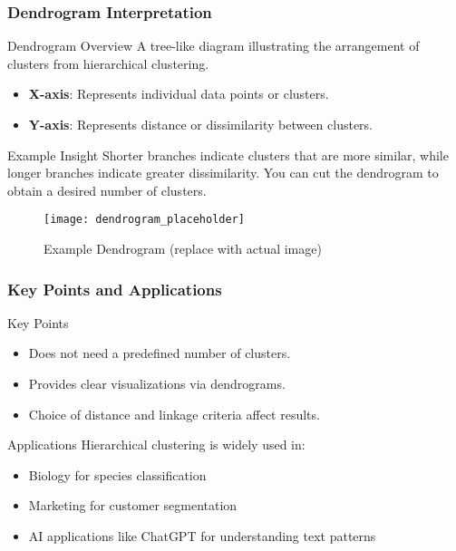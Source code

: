 \documentclass[aspectratio=169]{beamer}
\begin{document}
\begin{frame}[fragile]
    \frametitle{Dendrogram Interpretation}
    \begin{block}{Dendrogram Overview}
        A tree-like diagram illustrating the arrangement of clusters from hierarchical clustering.
    \end{block}
    \begin{itemize}
        \item \textbf{X-axis}: Represents individual data points or clusters.
        \item \textbf{Y-axis}: Represents distance or dissimilarity between clusters.
    \end{itemize}
    \begin{block}{Example Insight}
        Shorter branches indicate clusters that are more similar, while longer branches indicate greater dissimilarity.
        You can cut the dendrogram to obtain a desired number of clusters.
    \end{block}
    \begin{figure}
        \centering
        \texttt{[image: dendrogram\_placeholder]}
        \caption{Example Dendrogram (replace with actual image)}
    \end{figure}
\end{frame}

\begin{frame}[fragile]
    \frametitle{Key Points and Applications}
    \begin{block}{Key Points}
        \begin{itemize}
            \item Does not need a predefined number of clusters.
            \item Provides clear visualizations via dendrograms.
            \item Choice of distance and linkage criteria affect results.
        \end{itemize}
    \end{block}
    \begin{block}{Applications}
        Hierarchical clustering is widely used in:
        \begin{itemize}
            \item Biology for species classification
            \item Marketing for customer segmentation
            \item AI applications like ChatGPT for understanding text patterns
        \end{itemize}
    \end{block}
\end{frame}
\end{document}
